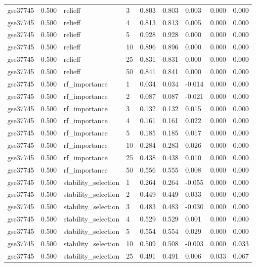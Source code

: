\begin{table}[t]
\begin{tabular}{lllllllll}
    gse37745 & 0.500 & relieff & 3 & 0.803 & 0.803 & 0.003 & 0.000 & 0.000 \\
    gse37745 & 0.500 & relieff & 4 & 0.813 & 0.813 & 0.005 & 0.000 & 0.000 \\
    gse37745 & 0.500 & relieff & 5 & 0.928 & 0.928 & 0.000 & 0.000 & 0.000 \\
    gse37745 & 0.500 & relieff & 10 & 0.896 & 0.896 & 0.000 & 0.000 & 0.000 \\
    gse37745 & 0.500 & relieff & 25 & 0.831 & 0.831 & 0.000 & 0.000 & 0.000 \\
    gse37745 & 0.500 & relieff & 50 & 0.841 & 0.841 & 0.000 & 0.000 & 0.000 \\
    gse37745 & 0.500 & rf\_importance & 1 & 0.034 & 0.034 & -0.014 & 0.000 & 0.000 \\
    gse37745 & 0.500 & rf\_importance & 2 & 0.087 & 0.087 & -0.021 & 0.000 & 0.000 \\
    gse37745 & 0.500 & rf\_importance & 3 & 0.132 & 0.132 & 0.015 & 0.000 & 0.000 \\
    gse37745 & 0.500 & rf\_importance & 4 & 0.161 & 0.161 & 0.022 & 0.000 & 0.000 \\
    gse37745 & 0.500 & rf\_importance & 5 & 0.185 & 0.185 & 0.017 & 0.000 & 0.000 \\
    gse37745 & 0.500 & rf\_importance & 10 & 0.284 & 0.283 & 0.026 & 0.000 & 0.000 \\
    gse37745 & 0.500 & rf\_importance & 25 & 0.438 & 0.438 & 0.010 & 0.000 & 0.000 \\
    gse37745 & 0.500 & rf\_importance & 50 & 0.556 & 0.555 & 0.008 & 0.000 & 0.000 \\
    gse37745 & 0.500 & stability\_selection & 1 & 0.264 & 0.264 & -0.055 & 0.000 & 0.000 \\
    gse37745 & 0.500 & stability\_selection & 2 & 0.449 & 0.449 & 0.033 & 0.000 & 0.000 \\
    gse37745 & 0.500 & stability\_selection & 3 & 0.483 & 0.483 & -0.030 & 0.000 & 0.000 \\
    gse37745 & 0.500 & stability\_selection & 4 & 0.529 & 0.529 & 0.001 & 0.000 & 0.000 \\
    gse37745 & 0.500 & stability\_selection & 5 & 0.554 & 0.554 & 0.029 & 0.000 & 0.000 \\
    gse37745 & 0.500 & stability\_selection & 10 & 0.509 & 0.508 & -0.003 & 0.000 & 0.033 \\
    gse37745 & 0.500 & stability\_selection & 25 & 0.491 & 0.491 & 0.006 & 0.033 & 0.067 \\

\end{tabular}
\end{table}
